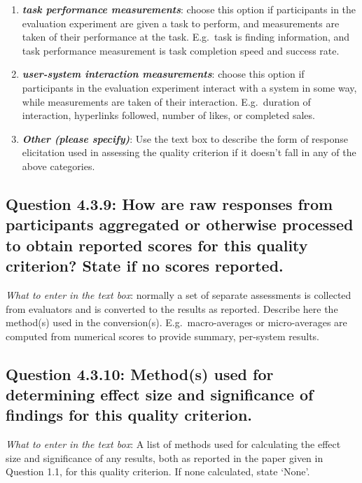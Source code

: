\documentclass[11pt,a4paper]{article}
\newcommand{\egcvalue}[1]{\textbf{\textit{#1}}}
\begin{document}
\begin{enumerate}[itemsep=0cm,leftmargin=0.5cm,label={\LARGE $\circ$}]
    \item \egcvalue{task performance measurements}: choose this option if participants in the evaluation experiment are given a task to perform, and measurements are taken of their performance at the task.  E.g.\ task is finding information, and task performance measurement is task completion speed and success rate.
    \item \egcvalue{user-system interaction measurements}: choose this option if participants in the evaluation experiment interact with a system in some way, while measurements are taken of their interaction. E.g.\ duration of interaction, hyperlinks followed, number of likes, or completed sales.
    \item \egcvalue{Other (please specify)}: Use the text box to describe the form of response elicitation used in assessing the quality criterion if it doesn't fall in any of the above categories.
\end{enumerate}

\subsection*{Question 4.3.9:  How are raw responses from participants aggregated or otherwise processed to obtain reported scores for this quality criterion? State if no scores reported.}
\vspace{-.1cm}

\vspace{.3cm}
\noindent\textit{What to enter in the text box}:  normally a set of separate assessments is collected from evaluators and is converted to the results as reported. Describe here the method(s) used in the conversion(s). E.g.\ macro-averages or micro-averages are computed from numerical scores to provide summary, per-system results.

\vspace{-.3cm}
\subsection*{Question 4.3.10:  Method(s) used for determining effect size and significance of findings for this quality criterion.}
\vspace{-.1cm}

\vspace{.3cm}
\noindent\textit{What to enter in the text box}: A list of  methods used for calculating the effect size and significance of any results, both as reported in the paper given in Question 1.1, for this quality criterion. If none calculated, state `None'.
\end{document}
